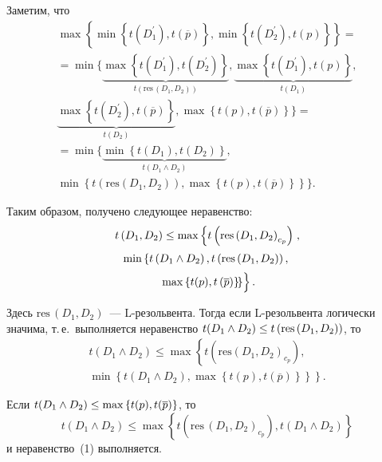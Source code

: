 \begin{multicols}{2}
  Заметим, что
  \begin{multline*}
\max\left\{\min \left\{ t\left(D_1^\prime\right), t\left(\overline{p}\right)\right\}, \min \left\{ t\left( D_2^\prime\right), t(p)\right\}\right\}={}\\[2pt]
{}=  
  \min\Bigg\{ 
  \underbrace{\max\left\{ t(D_1^\prime), t(D_2^\prime)\right\}}_{t(\mathrm{res}\,(D_1,D_2))}, 
\underbrace{\max\left\{ t(D_1^\prime), t(p)\right\}}_{t(D_1)},\\[2pt] 
\underbrace{\max\left\{ t(D_2^\prime), t(\overline{p})\right\}}_{t(D_2)}, 
\max\left\{ t(p), t(\overline{p})\right\}\Bigg\}={}\\[2pt]
  {}= \min\Bigg\{
  \underbrace{\min\left\{ t(D_1), t(D_2)\right\}}_{t(D_1\wedge D_2)},\\[2pt]
   \min\left\{ 
t\left(\mathrm{res}\left(D_1, D_2\right)\right), \max\left\{t(p), t(\overline{p})\right\}\right\}
  \Bigg\}.
  \end{multline*}
  
  Таким образом, получено следующее не\-ра\-вен\-ство:
  \begin{multline*}
  t\left(D_1, D_2\right) \leq \max\left\{ t\left( \mathrm{res}\left(D_1, D_2\right)_{c_p}\right)\right.,\\[2pt]
 \min \left\{ t\left(D_1\wedge D_2\right), t\left(\mathrm{res}\left(D_1,D_2\right)\right),\right.\\[2pt]
\left.   \left. \max \left\{ t(p), 
t\left(\overline{p}\right)\right\}\!\right\}\!
\vphantom{\left( \mathrm{res}\left(D_1, D_2\right)_{c_p}\right)}
\right\}.
 \end{multline*}
 
 \noindent
  Здесь $\mathrm{res}\,(D_1, D_2)$~--- \mbox{L-ре}\-золь\-вен\-та. Тогда если \mbox{L-ре}\-золь\-ве\-нта 
логически значима, т.\,е.\ выполняется неравенство $t(D_1\wedge D_2) \hm\leq 
t\left( \mathrm{res}\,(D_1, D_2)\right)$, то
  \begin{multline*}
  t(D_1\wedge D_2) \leq \max \left\{ t\left( \mathrm{res}\left (D_1,D_2\right)_{c_p}\right),\right.\\
\left.  \min \left\{ 
t(D_1\wedge D_2), \max \left\{ t(p), t(\overline{p})\right\}\right\}\right\}.
\end{multline*}
  
  Если $t(D_1\wedge D_2)\hm\leq \max \left\{ t(p), t(\overline{p})\right\}$, то
  $$
  t(D_1\wedge D_2)\leq \max \left\{ t\left( \mathrm{res}\,(D_1, D_2)_{c_p}\right), 
t(D_1\wedge D_2)\right\}
  $$
и неравенство~(1) выполняется.
  

\end{multicols}
